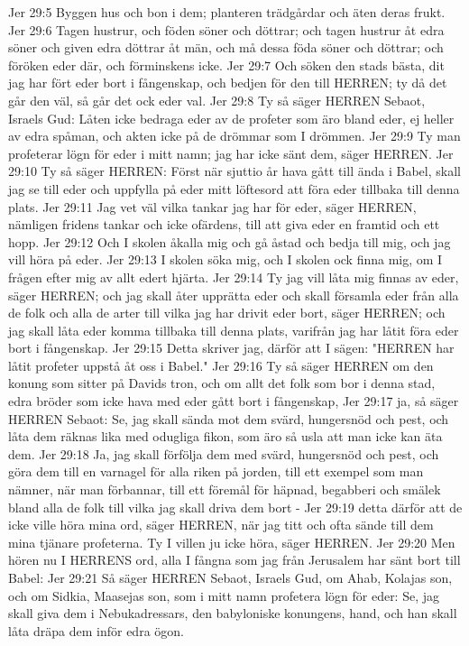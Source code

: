 Jer 29:5  Byggen hus och bon i dem; planteren trädgårdar och äten deras frukt.
Jer 29:6  Tagen hustrur, och föden söner och döttrar; och tagen hustrur åt edra söner och given edra döttrar åt män, och må dessa föda söner och döttrar; och föröken eder där, och förminskens icke.
Jer 29:7  Och söken den stads bästa, dit jag har fört eder bort i fångenskap, och bedjen för den till HERREN; ty då det går den väl, så går det ock eder val.
Jer 29:8  Ty så säger HERREN Sebaot, Israels Gud: Låten icke bedraga eder av de profeter som äro bland eder, ej heller av edra spåman, och akten icke på de drömmar som I drömmen.
Jer 29:9  Ty man profeterar lögn för eder i mitt namn; jag har icke sänt dem, säger HERREN.
Jer 29:10  Ty så säger HERREN: Först när sjuttio år hava gått till ända i Babel, skall jag se till eder och uppfylla på eder mitt löftesord att föra eder tillbaka till denna plats.
Jer 29:11  Jag vet väl vilka tankar jag har för eder, säger HERREN, nämligen fridens tankar och icke ofärdens, till att giva eder en framtid och ett hopp.
Jer 29:12  Och I skolen åkalla mig och gå åstad och bedja till mig, och jag vill höra på eder.
Jer 29:13  I skolen söka mig, och I skolen ock finna mig, om I frågen efter mig av allt edert hjärta.
Jer 29:14  Ty jag vill låta mig finnas av eder, säger HERREN; och jag skall åter upprätta eder och skall församla eder från alla de folk och alla de arter till vilka jag har drivit eder bort, säger HERREN; och jag skall låta eder komma tillbaka till denna plats, varifrån jag har låtit föra eder bort i fångenskap.
Jer 29:15  Detta skriver jag, därför att I sägen: "HERREN har låtit profeter uppstå åt oss i Babel."
Jer 29:16  Ty så säger HERREN om den konung som sitter på Davids tron, och om allt det folk som bor i denna stad, edra bröder som icke hava med eder gått bort i fångenskap,
Jer 29:17  ja, så säger HERREN Sebaot: Se, jag skall sända mot dem svärd, hungersnöd och pest, och låta dem räknas lika med odugliga fikon, som äro så usla att man icke kan äta dem.
Jer 29:18  Ja, jag skall förfölja dem med svärd, hungersnöd och pest, och göra dem till en varnagel för alla riken på jorden, till ett exempel som man nämner, när man förbannar, till ett föremål för häpnad, begabberi och smälek bland alla de folk till vilka jag skall driva dem bort -
Jer 29:19  detta därför att de icke ville höra mina ord, säger HERREN, när jag titt och ofta sände till dem mina tjänare profeterna. Ty I villen ju icke höra, säger HERREN.
Jer 29:20  Men hören nu I HERRENS ord, alla I fångna som jag från Jerusalem har sänt bort till Babel:
Jer 29:21  Så säger HERREN Sebaot, Israels Gud, om Ahab, Kolajas son, och om Sidkia, Maasejas son, som i mitt namn profetera lögn för eder: Se, jag skall giva dem i Nebukadressars, den babyloniske konungens, hand, och han skall låta dräpa dem inför edra ögon.
